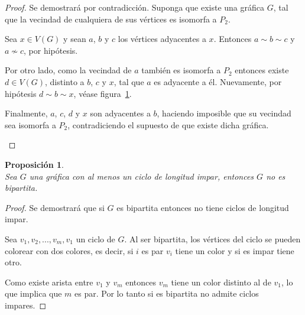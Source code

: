 \documentclass[12pt]{book}
\newtheorem{proposition}{Proposición}
\theoremstyle{definition}
\begin{document}
\begin{proof} Se demostrará por contradicción. Suponga que existe una gráfica $G$, tal que la vecindad de cualquiera de sus vértices es isomorfa a $P_2$. 

Sea $x\in V(G)$ y sean $a$, $b$ y $c$ los vértices adyacentes a $x$. Entonces $a\sim b\sim c$ y $a\nsim c$, por hipótesis.

Por otro lado, como la vecindad de $a$ también es isomorfa a $P_2$ entonces existe $d\in V(G)$, distinto a $b$, $c$ y $x$, tal que $a$ es adyacente a \'el. Nuevamente, por hipótesis $d\sim b\sim x$, véase figura~\ref{isomorfp2}.

Finalmente, $a$, $c$, $d$ y $x$ son adyacentes a $b$, haciendo imposible que su vecindad sea isomorfa a $P_2$, contradiciendo el supuesto de que existe dicha gráfica.   


\begin{figure}\centering
  \caption{}\label{isomorfp2}
\end{figure}
\end{proof}



\begin{proposition}\textbf{}\\
  Sea $G$ una gráfica con al menos un ciclo de longitud impar, entonces $G$ no es
  bipartita.
\end{proposition}

\begin{proof} Se demostrará que si $G$ es bipartita entonces no
tiene ciclos de longitud impar.

 Sea $v_1, v_2,..., v_m, v_1$ un ciclo
de $G$. Al ser bipartita, los vértices del ciclo se pueden  colorear con dos
colores, es decir, si $i$ es par $v_i$ tiene un color y si es impar
tiene otro.

 Como existe arista entre $v_1$ y $v_m$ entonces $v_m$
tiene un color distinto al de $v_1$, lo que implica que $m$ es par.
Por lo tanto si es bipartita no admite ciclos impares.
\end{proof}
\end{document}
